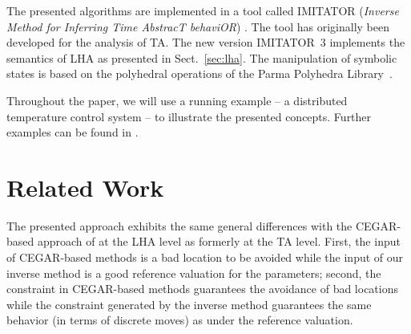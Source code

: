 \documentclass{llncs}
\begin{document}
The presented algorithms are implemented in a tool called IMITATOR
(\emph{Inverse Method for Inferring Time AbstracT behaviOR})
\cite{And:2010}. The tool has originally been developed for the
analysis of TA. The new version IMITATOR~3 implements the semantics of
LHA as presented in Sect.~\ref{sec:lha}. The manipulation of
symbolic states is based on the polyhedral operations of the Parma
Polyhedra Library~\cite{BHZ:2009}.

Throughout the paper, we will use a running
example -- a distributed temperature control system -- to illustrate
the presented concepts. Further examples can be found in \cite{FK:2011}.

\section{Related Work} \label{sec:related}

The presented approach exhibits the same general differences with the
CEGAR-based approach of \cite{FJK:2008} at the LHA level as formerly
at the TA level. First, the input of CEGAR-based methods is a bad
location to be avoided while the input of our inverse method is a
good reference valuation for the parameters; second, the constraint in
CEGAR-based methods guarantees the avoidance of bad locations while the
constraint generated by the inverse method guarantees the same behavior
(in terms of discrete moves) as under the reference valuation.
\end{document}
